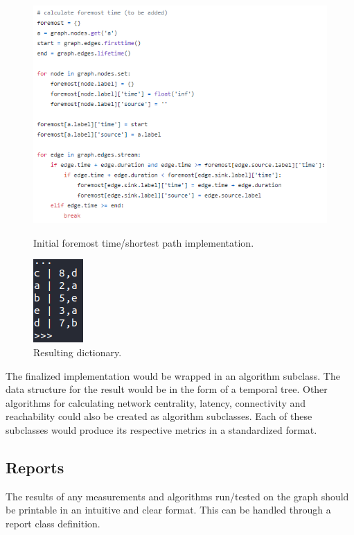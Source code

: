 \begin{design}
\clearpage
\begin{figure}[t]
  \centering
  \begin{minipage}[b]{0.4\textwidth}
    \centering
    \includegraphics[scale=0.8]{images/foremost_code.PNG}
    \caption{Initial foremost time/shortest path implementation.}
  \end{minipage}
  \hfill
  \begin{minipage}[b]{0.4\textwidth}
    \centering
    \includegraphics[scale=0.7]{images/foremost_result.PNG}
    \caption{Resulting dictionary.}
  \end{minipage}
\end{figure}
The finalized implementation would be wrapped in an algorithm subclass. The data structure for the result would be in the form of a temporal tree. Other algorithms for calculating network centrality, latency, connectivity and reachability could also be created as algorithm subclasses. Each of these subclasses would produce its respective metrics in a standardized format.
\subsection{Reports}
The results of any measurements and algorithms run/tested on the graph should be printable in an intuitive and clear format. This can be handled through a report class definition.

\end{design}
